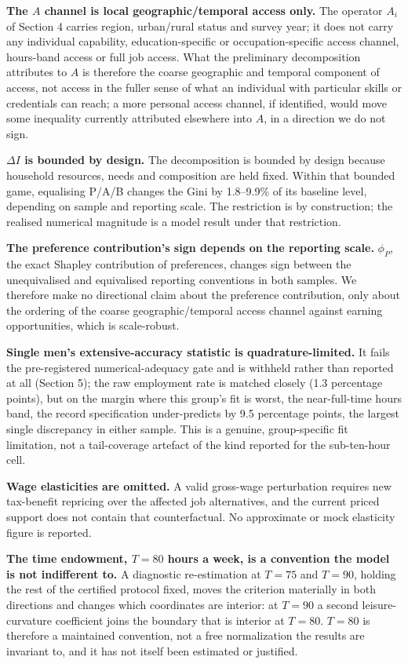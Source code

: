 \documentclass[11pt,a4paper]{article}
\begin{document}
\textbf{The \(A\) channel is local geographic/temporal access only.} The operator \(A_i\) of Section 4 carries region, urban/rural status and survey year; it does not carry any individual capability, education-specific or occupation-specific access channel, hours-band access or full job access. What the preliminary decomposition attributes to \(A\) is therefore the coarse geographic and temporal component of access, not access in the fuller sense of what an individual with particular skills or credentials can reach; a more personal access channel, if identified, would move some inequality currently attributed elsewhere into \(A\), in a direction we do not sign.

\textbf{\(\Delta I\) is bounded by design.} The decomposition is bounded by design because household resources, needs and composition are held fixed. Within that bounded game, equalising P/A/B changes the Gini by 1.8--9.9\% of its baseline level, depending on sample and reporting scale. The restriction is by construction; the realised numerical magnitude is a model result under that restriction.

\textbf{The preference contribution's sign depends on the reporting scale.} \(\phi_P\), the exact Shapley contribution of preferences, changes sign between the unequivalised and equivalised reporting conventions in both samples. We therefore make no directional claim about the preference contribution, only about the ordering of the coarse geographic/temporal access channel against earning opportunities, which is scale-robust.

\textbf{Single men's extensive-accuracy statistic is quadrature-limited.} It fails the pre-registered numerical-adequacy gate and is withheld rather than reported at all (Section 5); the raw employment rate is matched closely (1.3 percentage points), but on the margin where this group's fit is worst, the near-full-time hours band, the record specification under-predicts by 9.5 percentage points, the largest single discrepancy in either sample. This is a genuine, group-specific fit limitation, not a tail-coverage artefact of the kind reported for the sub-ten-hour cell.

\textbf{Wage elasticities are omitted.} A valid gross-wage perturbation requires new tax-benefit repricing over the affected job alternatives, and the current priced support does not contain that counterfactual. No approximate or mock elasticity figure is reported.

\textbf{The time endowment, \(T=80\) hours a week, is a convention the model is not indifferent to.} A diagnostic re-estimation at \(T=75\) and \(T=90\), holding the rest of the certified protocol fixed, moves the criterion materially in both directions and changes which coordinates are interior: at \(T=90\) a second leisure-curvature coefficient joins the boundary that is interior at \(T=80\). \(T=80\) is therefore a maintained convention, not a free normalization the results are invariant to, and it has not itself been estimated or justified.
\end{document}
